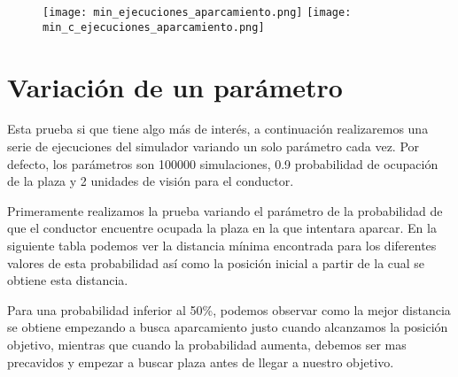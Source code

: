 \newpage

\begin{figure}[h]
\texttt{[image: min\_ejecuciones\_aparcamiento.png]}
\texttt{[image: min\_c\_ejecuciones\_aparcamiento.png]}
\centering
\end{figure}

\newpage


\section{Variación de un parámetro}
Esta prueba si que tiene algo más de interés, a continuación realizaremos una serie de ejecuciones del simulador variando un solo parámetro cada vez. Por defecto, los parámetros son 100000 simulaciones, 0.9 probabilidad de ocupación de la plaza y 2 unidades de visión para el conductor.

Primeramente realizamos la prueba variando el parámetro de la probabilidad de que el conductor encuentre ocupada la plaza en la que intentara aparcar. En la siguiente tabla podemos ver la distancia mínima encontrada para los diferentes valores de esta probabilidad así como la posición inicial a partir de la cual se obtiene esta distancia.

\begin{table}[h]
\centering
{}
\end{table}

Para una probabilidad inferior al 50\%, podemos observar como la mejor distancia se obtiene empezando a busca aparcamiento justo cuando alcanzamos la posición objetivo, mientras que cuando la probabilidad aumenta, debemos ser mas precavidos y empezar a buscar plaza antes de llegar a nuestro objetivo.

